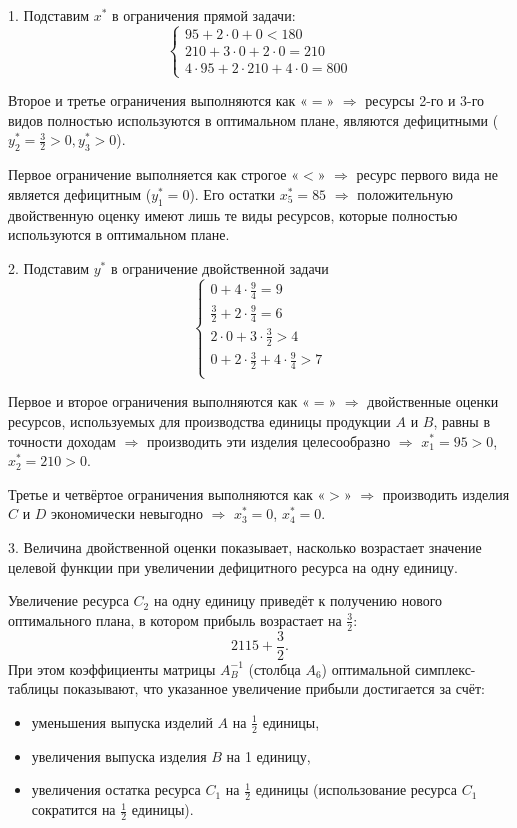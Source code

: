\documentclass[17pt]{extarticle}
\begin{document}
1. Подставим \( x^* \) в ограничения прямой задачи:
\[
    \begin{cases}
        95 + 2 \cdot 0 + 0 < 180          \\
        210 + 3 \cdot 0 + 2 \cdot 0 = 210 \\
        4 \cdot 95 + 2 \cdot 210 + 4 \cdot 0 = 800
    \end{cases}
\]

Второе и третье ограничения выполняются как «\( = \)» \(\Rightarrow\) ресурсы 2-го и 3-го видов полностью используются в оптимальном плане,
являются дефицитными (\( y_2^* = \frac{3}{2} > 0, y_3^* > 0 \)).

Первое ограничение выполняется как строгое «\( < \)» \(\Rightarrow\) ресурс первого вида не является дефицитным (\( y_1^* = 0 \)).
Его остатки \( x_5^* = 85 \) \(\Rightarrow\) положительную двойственную оценку имеют лишь те виды ресурсов,
которые полностью используются в оптимальном плане.

2. Подставим $y^*$ в ограничение двойственной задачи
\[
    \begin{cases}
        0 + 4 \cdot \frac{9}{4} = 9                       \\
        \frac{3}{2} + 2 \cdot \frac{9}{4} = 6             \\
        2 \cdot 0 + 3 \cdot \frac{3}{2} > 4               \\
        0 + 2 \cdot \frac{3}{2} + 4 \cdot \frac{9}{4} > 7 \\
    \end{cases}
\]

Первое и второе ограничения выполняются как «\( = \)» \(\Rightarrow\) двойственные оценки ресурсов,
используемых для производства единицы продукции \( A \) и \( B \),
равны в точности доходам \(\Rightarrow\) производить эти изделия целесообразно \(\Rightarrow\) \( x_1^* = 95 > 0 \), \( x_2^* = 210 > 0 \).

Третье и четвёртое ограничения выполняются как «\( > \)» \(\Rightarrow\) производить изделия \( C \) и \( D \)
экономически невыгодно \(\Rightarrow\) \( x_3^* = 0 \), \( x_4^* = 0 \).

3. Величина двойственной оценки показывает, насколько возрастает значение целевой функции при увеличении дефицитного ресурса на одну единицу.

Увеличение ресурса \( C_2 \) на одну единицу приведёт к получению нового оптимального плана, в котором прибыль возрастает на \( \frac{3}{2} \):
\[
    2115 + \frac{3}{2}.
\]
При этом коэффициенты матрицы \( A^{-1}_B \) (столбца \( A_6 \)) оптимальной симплекс-таблицы показывают, что указанное увеличение прибыли достигается за счёт:
\begin{itemize}
    \item уменьшения выпуска изделий \( A \) на \( \frac{1}{2} \) единицы,
    \item увеличения выпуска изделия \( B \) на 1 единицу,
    \item увеличения остатка ресурса \( C_1 \) на \( \frac{1}{2} \) единицы (использование ресурса \( C_1 \) сократится на \( \frac{1}{2} \) единицы).
\end{itemize}
\end{document}
